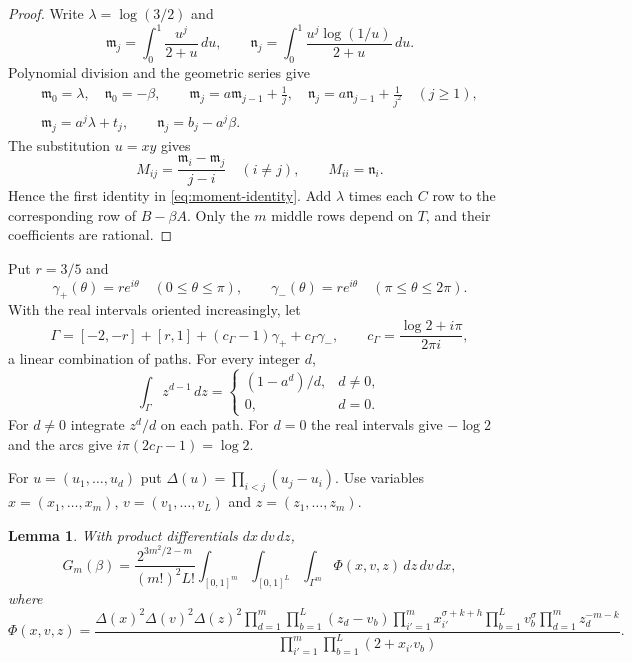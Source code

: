 \documentclass{amsart}
\newtheorem{lemma}{Lemma}[section]
\numberwithin{equation}{section}
\numberwithin{table}{section}
\begin{document}
\begin{proof}
Write $\lambda=\log(3/2)$ and
\[
\mathfrak m_j=\int_0^1\frac{u^j}{2+u}\,du,\qquad
\mathfrak n_j=\int_0^1\frac{u^j\log(1/u)}{2+u}\,du.
\]
Polynomial division and the geometric series give
\begin{equation*}
\begin{gathered}
\mathfrak m_0=\lambda,\quad \mathfrak n_0=-\beta,\qquad
\mathfrak m_j=a\mathfrak m_{j-1}+\frac1j,\quad
\mathfrak n_j=a\mathfrak n_{j-1}+\frac1{j^2}\quad(j\ge1),\\
\mathfrak m_j=a^j\lambda+t_j,\qquad \mathfrak n_j=b_j-a^j\beta.
\end{gathered}
\end{equation*}
The substitution $u=xy$ gives
\[
M_{ij}=\frac{\mathfrak m_i-\mathfrak m_j}{j-i}\quad(i\ne j),\qquad M_{ii}=\mathfrak n_i.
\]
Hence the first identity in \eqref{eq:moment-identity}. Add $\lambda$
times each $C$ row to the corresponding row of $B-\beta A$. Only the $m$
middle rows depend on $T$, and their coefficients are rational.
\end{proof}

Put $r=3/5$ and
\[
\gamma_+(\theta)=re^{i\theta}\quad(0\le\theta\le\pi),\qquad
\gamma_-(\theta)=re^{i\theta}\quad(\pi\le\theta\le2\pi).
\]
With the real intervals oriented increasingly, let
\begin{equation*}
\Gamma=[-2,-r]+[r,1]+(c_\Gamma-1)\gamma_++c_\Gamma\gamma_-,\qquad
c_\Gamma=\frac{\log2+i\pi}{2\pi i},
\end{equation*}
a linear combination of paths. For every integer $d$,
\begin{equation}\label{eq:laurent-moments}
\int_\Gamma z^{d-1}\,dz=
\begin{cases}
(1-a^d)/d,&d\ne0,\\
0,&d=0.
\end{cases}
\end{equation}
For $d\ne0$ integrate $z^d/d$ on each path. For $d=0$ the real intervals
give $-\log2$ and the arcs give $i\pi(2c_\Gamma-1)=\log2$.

For $u=(u_1,\ldots,u_d)$ put $\Delta(u)=\prod_{i<j}(u_j-u_i)$. Use variables
$x=(x_1,\ldots,x_m)$, $v=(v_1,\ldots,v_L)$ and $z=(z_1,\ldots,z_m)$.

\begin{lemma}\label{lem:integral-identity}
With product differentials $dx\,dv\,dz$,
\begin{equation}\label{eq:integral-identity}
G_m(\beta)=
\frac{2^{3m^2/2-m}}{(m!)^2L!}
\int_{[0,1]^m}\int_{[0,1]^L}\int_{\Gamma^m}
 \Phi(x,v,z)\,dz\,dv\,dx,
\end{equation}
where
\begin{equation*}
\Phi(x,v,z)=
\frac{\Delta(x)^2\Delta(v)^2\Delta(z)^2
\displaystyle\prod_{d=1}^{m}\prod_{b=1}^{L}(z_d-v_b)
\displaystyle\prod_{i'=1}^{m}x_{i'}^{\sigma+k+h}
\prod_{b=1}^{L}v_b^\sigma\prod_{d=1}^{m}z_d^{-m-k}}
{\displaystyle\prod_{i'=1}^{m}\prod_{b=1}^{L}(2+x_{i'}v_b)}.
\end{equation*}
\end{lemma}
\end{document}
